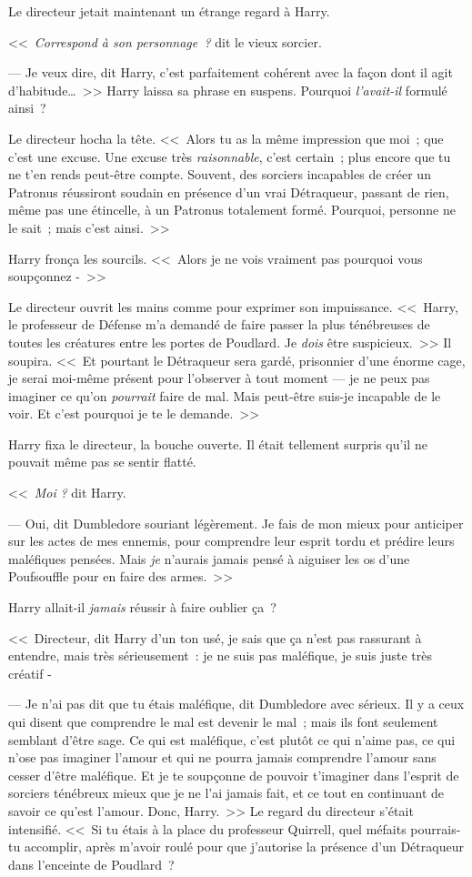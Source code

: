 Le directeur jetait maintenant un étrange regard à Harry.

<<~\emph{Correspond à son personnage~?} dit le vieux sorcier.

--- Je veux dire, dit Harry, c'est parfaitement cohérent avec la façon dont il agit d'habitude…~>> Harry laissa sa phrase en suspens. Pourquoi \emph{l'avait-il} formulé ainsi~?

Le directeur hocha la tête. <<~Alors tu as la même impression que moi~; que c'est une excuse. Une excuse très \emph{raisonnable}, c'est certain~; plus encore que tu ne t'en rends peut-être compte. Souvent, des sorciers incapables de créer un Patronus réussiront soudain en présence d'un vrai Détraqueur, passant de rien, même pas une étincelle, à un Patronus totalement formé. Pourquoi, personne ne le sait~; mais c'est ainsi.~>>

Harry fronça les sourcils. <<~Alors je ne vois vraiment pas pourquoi vous soupçonnez -~>>

Le directeur ouvrit les mains comme pour exprimer son impuissance. <<~Harry, le professeur de Défense m'a demandé de faire passer la plus ténébreuses de toutes les créatures entre les portes de Poudlard. Je \emph{dois} être suspicieux.~>> Il soupira. <<~Et pourtant le Détraqueur sera gardé, prisonnier d'une énorme cage, je serai moi-même présent pour l'observer à tout moment — je ne peux pas imaginer ce qu'on \emph{pourrait} faire de mal. Mais peut-être suis-je incapable de le voir. Et c'est pourquoi je te le demande.~>>

Harry fixa le directeur, la bouche ouverte. Il était tellement surpris qu'il ne pouvait même pas se sentir flatté.

<<~\emph{Moi} \emph{?} dit Harry.

--- Oui, dit Dumbledore souriant légèrement. Je fais de mon mieux pour anticiper sur les actes de mes ennemis, pour comprendre leur esprit tordu et prédire leurs maléfiques pensées. Mais \emph{je} n'aurais jamais pensé à aiguiser les os d'une Poufsouffle pour en faire des armes.~>>

Harry allait-il \emph{jamais} réussir à faire oublier ça~?

<<~Directeur, dit Harry d'un ton usé, je sais que ça n'est pas rassurant à entendre, mais très sérieusement~: je ne suis pas maléfique, je suis juste très créatif -

--- Je n'ai pas dit que tu étais maléfique, dit Dumbledore avec sérieux. Il y a ceux qui disent que comprendre le mal est devenir le mal~; mais ils font seulement semblant d'être sage. Ce qui est maléfique, c'est plutôt ce qui n'aime pas, ce qui n'ose pas imaginer l'amour et qui ne pourra jamais comprendre l'amour sans cesser d'être maléfique. Et je te soupçonne de pouvoir t'imaginer dans l'esprit de sorciers ténébreux mieux que je ne l'ai jamais fait, et ce tout en continuant de savoir ce qu'est l'amour. Donc, Harry.~>> Le regard du directeur s'était intensifié. <<~Si tu étais à la place du professeur Quirrell, quel méfaits pourrais-tu accomplir, après m'avoir roulé pour que j'autorise la présence d'un Détraqueur dans l'enceinte de Poudlard~?

